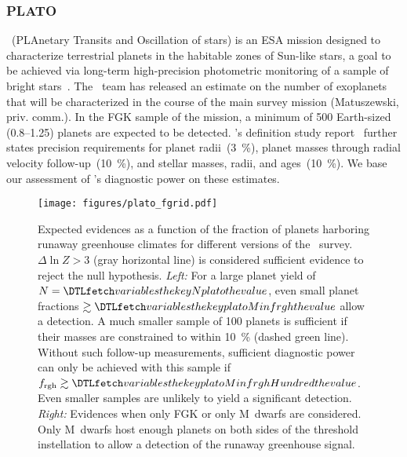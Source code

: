 \documentclass[modern]{aastex631}
\begin{document}
\subsubsection{PLATO}
\plato\ (PLAnetary Transits and Oscillation of stars) is an ESA mission designed to characterize terrestrial planets in the habitable zones of Sun-like stars, a goal to be achieved via long-term high-precision photometric monitoring of a sample of bright stars~\citep{Rauer2016}.
The \plato\ team has released an estimate on the number of exoplanets that will be characterized in the course of the main survey mission (Matuszewski, priv. comm.).
In the FGK sample of the mission, a minimum of 500 Earth-sized (\SIrange{0.8}{1.25}{\rEarth}) planets are expected to be detected.
\plato's definition study report~\citep{plato2017} further states precision requirements for planet radii~(\SI{3}{\percent}), planet masses through radial velocity follow-up~(\SI{10}{\percent}), and stellar masses, radii, and ages~(\SI{10}{\percent}).
We base our assessment of \plato's diagnostic power on these estimates.

    \begin{figure*}[ht!]
        \begin{centering}
            \texttt{[image: figures/plato\_fgrid.pdf]}
            \caption{
            Expected evidences as a function of the fraction of planets harboring runaway greenhouse climates for different versions of the \plato\ survey.
            $\Delta \ln Z > 3$ (gray horizontal line) is considered sufficient evidence to reject the null hypothesis.
            \textit{Left:} For a large planet yield of $N = \var{Nplato}$, even small planet fractions $\gtrsim \var{platoMinfrgh}$ allow a detection.
                A much smaller sample of 100 planets is sufficient if their masses are constrained to within \SI{10}{\percent} (dashed green line).
                Without such follow-up measurements, sufficient diagnostic power can only be achieved with this sample if $f_\mathrm{rgh} \gtrsim \var{platoMinfrghHundred}$.
               Even smaller samples are unlikely to yield a significant detection.
            \textit{Right:} Evidences when only FGK or only M~dwarfs are considered.
                Only M~dwarfs host enough planets on both sides of the threshold instellation to allow a detection of the runaway greenhouse signal.
            }
            \label{fig:plato_fgrid}
        \end{centering}
    \end{figure*}
\end{document}
